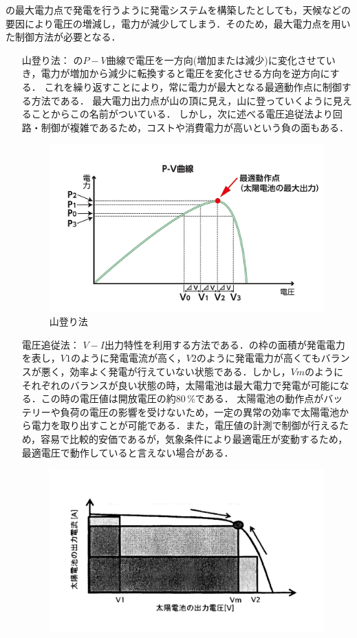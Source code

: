\begin{enumerate}[(1)]
	の最大電力点で発電を行うように発電システムを構築したとしても，天候などの要因により電圧の増減し，電力が減少してしまう．そのため，最大電力点を用いた制御方法が必要となる．
	\begin{enumerate}
		\item[山登り法：] の$P-V$曲線で電圧を一方向(増加または減少)に変化させていき，電力が増加から減少に転換すると電圧を変化させる方向を逆方向にする． これを繰り返すことにより，常に電力が最大となる最適動作点に制御する方法である\cite{esfvjsp}．
		最大電力出力点が山の頂に見え，山に登っていくように見えることからこの名前がついている．
		しかし，次に述べる電圧追従法より回路・制御が複雑であるため，コストや消費電力が高いという負の面もある\cite{nvdfsjknv}．
		\begin{figure}[h]
		\centering
		\includegraphics[scale=0.5]{./fig/mountan.png}
		\caption{山登り法\cite{esfvjsp}}
		\label{fig:mountan}
		\end{figure}
		\item[電圧追従法：]$V-I$出力特性を利用する方法である．の枠の面積が発電電力を表し，$V1$のように発電電流が高く，$V2$のように発電電力が高くてもバランスが悪く，効率よく発電が行えていない状態である．しかし，$Vm$のようにそれぞれのバランスが良い状態の時，太陽電池は最大電力で発電が可能になる．この時の電圧値は開放電圧の約$80\,\%$である．
		太陽電池の動作点がバッテリーや負荷の電圧の影響を受けないため，一定の異常の効率で太陽電池から電力を取り出すことが可能である．また，電圧値の計測で制御が行えるため，容易で比較的安価であるが，気象条件により最適電圧が変動するため，最適電圧で動作していると言えない場合がある\cite{nvdfsjknv}．
		\begin{figure}[h]
		\centering
		\includegraphics[scale=1]{./fig/area.png}

\end{figure}
\end{enumerate}
\end{enumerate}
